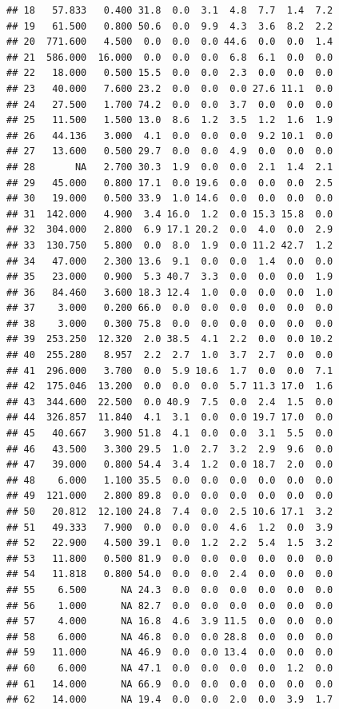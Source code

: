\documentclass[]{report}
\begin{document}
\begin{verbatim}
## 18   57.833   0.400 31.8  0.0  3.1  4.8  7.7  1.4  7.2
## 19   61.500   0.800 50.6  0.0  9.9  4.3  3.6  8.2  2.2
## 20  771.600   4.500  0.0  0.0  0.0 44.6  0.0  0.0  1.4
## 21  586.000  16.000  0.0  0.0  0.0  6.8  6.1  0.0  0.0
## 22   18.000   0.500 15.5  0.0  0.0  2.3  0.0  0.0  0.0
## 23   40.000   7.600 23.2  0.0  0.0  0.0 27.6 11.1  0.0
## 24   27.500   1.700 74.2  0.0  0.0  3.7  0.0  0.0  0.0
## 25   11.500   1.500 13.0  8.6  1.2  3.5  1.2  1.6  1.9
## 26   44.136   3.000  4.1  0.0  0.0  0.0  9.2 10.1  0.0
## 27   13.600   0.500 29.7  0.0  0.0  4.9  0.0  0.0  0.0
## 28       NA   2.700 30.3  1.9  0.0  0.0  2.1  1.4  2.1
## 29   45.000   0.800 17.1  0.0 19.6  0.0  0.0  0.0  2.5
## 30   19.000   0.500 33.9  1.0 14.6  0.0  0.0  0.0  0.0
## 31  142.000   4.900  3.4 16.0  1.2  0.0 15.3 15.8  0.0
## 32  304.000   2.800  6.9 17.1 20.2  0.0  4.0  0.0  2.9
## 33  130.750   5.800  0.0  8.0  1.9  0.0 11.2 42.7  1.2
## 34   47.000   2.300 13.6  9.1  0.0  0.0  1.4  0.0  0.0
## 35   23.000   0.900  5.3 40.7  3.3  0.0  0.0  0.0  1.9
## 36   84.460   3.600 18.3 12.4  1.0  0.0  0.0  0.0  1.0
## 37    3.000   0.200 66.0  0.0  0.0  0.0  0.0  0.0  0.0
## 38    3.000   0.300 75.8  0.0  0.0  0.0  0.0  0.0  0.0
## 39  253.250  12.320  2.0 38.5  4.1  2.2  0.0  0.0 10.2
## 40  255.280   8.957  2.2  2.7  1.0  3.7  2.7  0.0  0.0
## 41  296.000   3.700  0.0  5.9 10.6  1.7  0.0  0.0  7.1
## 42  175.046  13.200  0.0  0.0  0.0  5.7 11.3 17.0  1.6
## 43  344.600  22.500  0.0 40.9  7.5  0.0  2.4  1.5  0.0
## 44  326.857  11.840  4.1  3.1  0.0  0.0 19.7 17.0  0.0
## 45   40.667   3.900 51.8  4.1  0.0  0.0  3.1  5.5  0.0
## 46   43.500   3.300 29.5  1.0  2.7  3.2  2.9  9.6  0.0
## 47   39.000   0.800 54.4  3.4  1.2  0.0 18.7  2.0  0.0
## 48    6.000   1.100 35.5  0.0  0.0  0.0  0.0  0.0  0.0
## 49  121.000   2.800 89.8  0.0  0.0  0.0  0.0  0.0  0.0
## 50   20.812  12.100 24.8  7.4  0.0  2.5 10.6 17.1  3.2
## 51   49.333   7.900  0.0  0.0  0.0  4.6  1.2  0.0  3.9
## 52   22.900   4.500 39.1  0.0  1.2  2.2  5.4  1.5  3.2
## 53   11.800   0.500 81.9  0.0  0.0  0.0  0.0  0.0  0.0
## 54   11.818   0.800 54.0  0.0  0.0  2.4  0.0  0.0  0.0
## 55    6.500      NA 24.3  0.0  0.0  0.0  0.0  0.0  0.0
## 56    1.000      NA 82.7  0.0  0.0  0.0  0.0  0.0  0.0
## 57    4.000      NA 16.8  4.6  3.9 11.5  0.0  0.0  0.0
## 58    6.000      NA 46.8  0.0  0.0 28.8  0.0  0.0  0.0
## 59   11.000      NA 46.9  0.0  0.0 13.4  0.0  0.0  0.0
## 60    6.000      NA 47.1  0.0  0.0  0.0  0.0  1.2  0.0
## 61   14.000      NA 66.9  0.0  0.0  0.0  0.0  0.0  0.0
## 62   14.000      NA 19.4  0.0  0.0  2.0  0.0  3.9  1.7

\end{verbatim}
\end{document}
